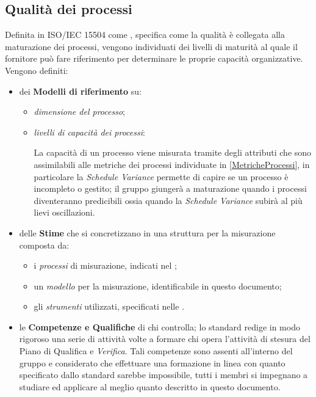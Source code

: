 	\subsection{Qualità dei processi}
	Definita in ISO/IEC 15504 come , specifica come la qualità è collegata alla maturazione dei processi, vengono individuati dei livelli di maturità al quale il fornitore può fare riferimento per determinare le proprie capacità organizzative. Vengono definiti:
	\begin{itemize}
		\item dei \textbf{Modelli di riferimento} su:
			\begin{itemize}
				\item \emph{dimensione del processo};
				\item \emph{livelli di capacità dei processi}:
					La capacità di un processo viene misurata tramite degli attributi che sono assimilabili alle metriche dei processi individuate in \ref{MetricheProcessi}, in particolare la \emph{Schedule Variance} permette di capire se un processo è incompleto o gestito; il gruppo giungerà a maturazione quando i processi diventeranno predicibili ossia quando la \emph{Schedule Variance} subirà al più lievi oscillazioni.
			\end{itemize}
		\item delle \textbf{Stime} che si concretizzano in una struttura per la misurazione composta da:
			\begin{itemize}
				\item i \emph{processi} di misurazione, indicati nel \PianoDiProgetto ;
				\item un \emph{modello} per la misurazione, identificabile in questo documento;
				\item gli \emph{strumenti} utilizzati, specificati nelle \NormeDiProgetto .
			\end{itemize}
		\item le \textbf{Competenze e Qualifiche} di chi controlla; lo standard redige in modo rigoroso una serie di attività volte a formare chi opera l'attività di stesura del Piano di Qualifica e \emph{Verifica}. Tali competenze sono assenti all'interno del gruppo e considerato che effettuare una formazione in linea con quanto specificato dallo standard sarebbe impossibile, tutti i membri si impegnano a studiare ed applicare al meglio quanto descritto in questo documento.
	\end{itemize}
	
